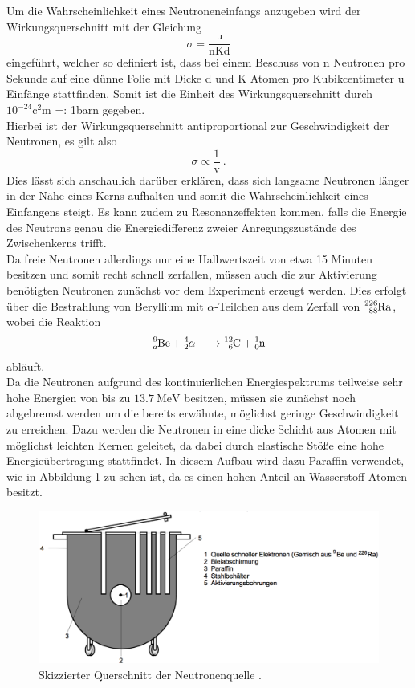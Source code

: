 Um die Wahrscheinlichkeit eines Neutroneneinfangs anzugeben wird der Wirkungsquerschnitt
mit der Gleichung
\begin{equation}
  \sigma = \frac{\text{u}}{\text{n}\text{K}\text{d}}
  \label{eqn:wqs}
\end{equation}
eingeführt, welcher so definiert ist, dass bei einem Beschuss von n Neutronen pro
Sekunde auf eine dünne Folie mit Dicke d und K Atomen pro Kubikcentimeter u Einfänge
stattfinden. Somit ist die Einheit des Wirkungsquerschnitt durch ${10^{-24}}\si{\square\centi\meter}$
=: 1barn gegeben.\\
Hierbei ist der Wirkungsquerschnitt antiproportional zur Geschwindigkeit der Neutronen, es
gilt also
\begin{equation}
  \sigma \propto \frac{1}{\text{v}} \: .
  \label{eqn:antiprop}
\end{equation}
Dies lässt sich anschaulich darüber erklären, dass sich langsame Neutronen länger in der
Nähe eines Kerns aufhalten und somit die Wahrscheinlichkeit eines Einfangens steigt.
Es kann zudem zu Resonanzeffekten kommen, falls die Energie des Neutrons genau
die Energiedifferenz zweier Anregungszustände des Zwischenkerns trifft. \\
Da freie Neutronen allerdings nur eine Halbwertszeit von etwa 15 Minuten besitzen und
somit recht schnell zerfallen, müssen auch die zur Aktivierung benötigten Neutronen
zunächst vor dem Experiment erzeugt werden.
Dies erfolgt über die Bestrahlung von Beryllium mit $\alpha$-Teilchen aus dem
Zerfall von $\ce{^{226}_{88}Ra}$, wobei die Reaktion
\begin{equation}
  \ce{^{9}_{a}Be + ^{4}_{2}}\alpha \ce{-> ^{12}_{6}C + ^1_0n}
\end{equation}
abläuft.\\
Da die Neutronen aufgrund des kontinuierlichen Energiespektrums teilweise sehr hohe
Energien von bis zu $\SI{13.7}{\mega\electronvolt}$ besitzen, müssen sie zunächst
noch abgebremst werden um die bereits erwähnte, möglichst geringe Geschwindigkeit zu
erreichen.
Dazu werden die Neutronen in eine dicke Schicht aus Atomen mit möglichst
leichten Kernen geleitet, da dabei durch elastische Stöße eine hohe Energieübertragung stattfindet.
In diesem Aufbau wird dazu Paraffin verwendet, wie in Abbildung
\ref{fig:neut} zu sehen ist, da es einen hohen Anteil an Wasserstoff-Atomen besitzt.
\begin{figure}[H]
  \centering
  \includegraphics[height=5cm]{Neutron.png}
  \caption{Skizzierter Querschnitt der Neutronenquelle \cite{skript}.}
  \label{fig:neut}
\end{figure}
